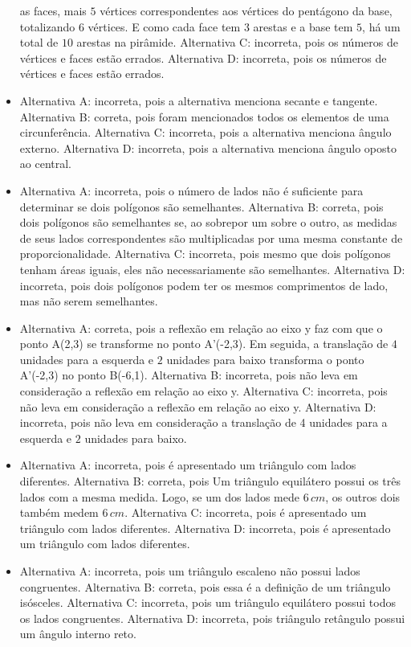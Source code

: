 \begin{itemize}
as faces, mais $5$ vértices correspondentes aos vértices do pentágono da
base, totalizando $6$ vértices. E como cada face tem $3$ arestas e a base
tem $5$, há um total de $10$ arestas na pirâmide.
Alternativa C: incorreta, pois os números de vértices e faces estão
errados.
Alternativa D: incorreta, pois os números de vértices e faces estão
errados.
\item Alternativa A: incorreta, pois a alternativa menciona secante e
tangente.
Alternativa B: correta, pois foram mencionados todos os elementos de uma
circunferência.
Alternativa C: incorreta, pois a alternativa menciona ângulo externo.
Alternativa D: incorreta, pois a alternativa menciona ângulo oposto ao
central.
\item Alternativa A: incorreta, pois o número de lados não é suficiente para
determinar se dois polígonos são semelhantes.
Alternativa B: correta, pois dois polígonos são semelhantes se, ao
sobrepor um sobre o outro, as medidas de seus lados correspondentes são
multiplicadas por uma mesma constante de proporcionalidade.
Alternativa C: incorreta, pois mesmo que dois polígonos tenham áreas
iguais, eles não necessariamente são semelhantes.
Alternativa D: incorreta, pois dois polígonos podem ter os mesmos
comprimentos de lado, mas não serem semelhantes.
\item Alternativa A: correta, pois a reflexão em relação ao eixo y faz com que
o ponto A(2,3) se transforme no ponto A'(-2,3). Em seguida, a translação
de $4$ unidades para a esquerda e $2$ unidades para baixo transforma o ponto
A'(-2,3) no ponto B(-6,1).
Alternativa B: incorreta, pois não leva em consideração a reflexão em
relação ao eixo y.
Alternativa C: incorreta, pois não leva em consideração a reflexão em
relação ao eixo y.
Alternativa D: incorreta, pois não leva em consideração a translação de
4 unidades para a esquerda e $2$ unidades para baixo.
\item Alternativa A: incorreta, pois é apresentado um triângulo com lados
diferentes.
Alternativa B: correta, pois Um triângulo equilátero possui os três
lados com a mesma medida. Logo, se um dos lados mede $6\,cm$, os outros dois
também medem $6\,cm$.
Alternativa C: incorreta, pois é apresentado um triângulo com lados
diferentes.
Alternativa D: incorreta, pois é apresentado um triângulo com lados
diferentes.
\item Alternativa A: incorreta, pois um triângulo escaleno não possui lados
congruentes.
Alternativa B: correta, pois essa é a definição de um triângulo
isósceles.
Alternativa C: incorreta, pois um triângulo equilátero possui todos os
lados congruentes.
Alternativa D: incorreta, pois triângulo retângulo possui um ângulo
interno reto.
\end{itemize}

